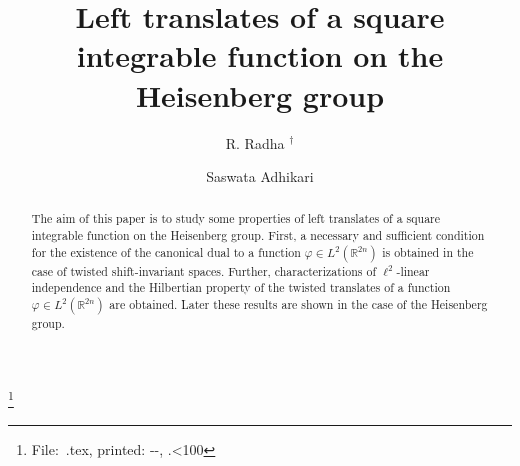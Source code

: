 \documentclass[a4paper,12pt,reqno]{amsart}
\theoremstyle{plain}
\numberwithin{equation}{section}
\theoremstyle{definition}
\newcounter {own}
\newcounter{minutes}\setcounter{minutes}{\time}
\newcounter{hours}\setcounter{hours}{\time}
\begin{document}

\title{Left translates of a square integrable function on the Heisenberg group}

\thanks{%
File:~\jobname .tex,
          printed: \number\year-\number\month-\number\day,
          \thehours.\ifnum\theminutes<10{0}\fi\theminutes}

\author{R. Radha $^\dagger$}

\address{R. Radha, Department of Mathematics,
Indian Institute of Technology Madras, Chennai--600 036, India.}
\author{Saswata Adhikari }
\address{Saswata Adhikari, Department of Mathematics,
Indian Institute of Technology Madras, Chennai--600 036, India.}

\maketitle
\pagestyle{myheadings}

\begin{abstract}
The aim of this paper is to study some properties of left translates of a square integrable function on the Heisenberg group. First, a necessary and sufficient condition for the existence of the canonical dual to a function $\varphi\in L^{2}(\mathbb{R}^{2n})$ is obtained in the case of twisted shift-invariant spaces. Further, characterizations of $\ell^{2}$-linear independence and the Hilbertian property of the twisted translates of a function $\varphi\in L^{2}(\mathbb{R}^{2n})$ are obtained. Later these results are shown in the case of the Heisenberg group.
\end{abstract}
\end{document}
